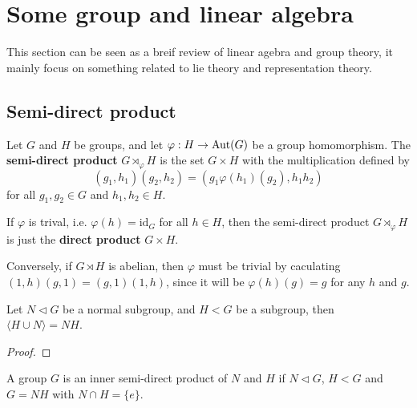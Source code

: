 \section{Some group and linear algebra}

This section can be seen as a breif review of linear agebra and group theory, it mainly focus on something related to lie theory and representation theory.

\subsection{Semi-direct product}

\begin{definition}
    Let \(G\) and \(H\) be groups, and let \(\varphi: H \to \operatorname{Aut}(G)\) be a group homomorphism. The \textbf{semi-direct product} \(G \rtimes_\varphi H\) is the set \(G \times H\) with the multiplication defined by
    \[(g_1, h_1)(g_2, h_2) = (g_1 \varphi(h_1)(g_2), h_1 h_2)\]
    for all \(g_1, g_2 \in G\) and \(h_1, h_2 \in H\).

\end{definition}

\begin{remark}
    If \(\varphi\) is trival, i.e. \(\varphi(h) = \mathrm{id}_G\) for all \(h \in H\), then the semi-direct product \(G \rtimes_\varphi H\) is just the \textbf{direct product} \(G \times H\).

    Conversely, if \(G \rtimes H\) is abelian, then \(\varphi\) must be trivial by caculating \((1,h)(g,1) = (g,1)(1,h)\), since it will be \(\varphi(h)(g) = g\) for any \(h\) and \(g\).

\end{remark}

\begin{lemma}
    Let \(N\vartriangleleft G\) be a normal subgroup, and \(H <G\) be a subgroup, then \(\langle H \cup N \rangle = NH\).
\end{lemma}
\begin{proof}
    
\end{proof}

\begin{definition}
    A group \(G\) is an inner semi-direct product of \(N\) and \(H\) if \(N \vartriangleleft G\), \(H < G\) and \(G = NH\) with \(N \cap H = \{e\}\).
\end{definition}

